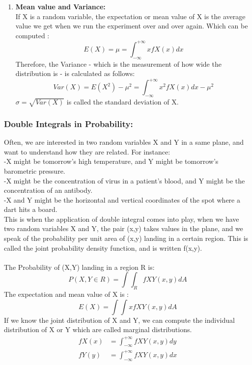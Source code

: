 \documentclass[a4paper]{article}
\begin{document}
\begin{enumerate}
\begin{itemize}
	      \end{itemize}
	\item \textbf{Mean value and Variance:} \\
	      If X is a random variable, the expectation or mean value of X is the average value we get when we run the experiment over and over again. Which can be computed : 
	      \begin{equation*}
		      E(X) = \mu =  \int_{-\infty}^{+\infty} xfX(x)dx
	      \end{equation*}
	      Therefore, the Variance - which is the measurement of how wide the distribution is - is calculated as follows:
	      \begin{equation*}
		      Var(X) = E(X^{2}) - \mu ^{2} = \int_{-\infty}^{+\infty} x^{2}fX(x)dx - \mu ^{2}
	      \end{equation*}
	      $\sigma = \sqrt{Var(X)}$ is called the standard deviation of X.
	      
\end{enumerate}
\subsubsection*{Double Integrals in Probability:}
Often, we are interested in two random variables X and Y in a same plane, and want to understand how they are related. For instance: \\
-X might be tomorrow's high temperature, and Y might be tomorrow's barometric pressure. \\
-X might be the concentration of virus in a patient's blood, and Y might be the concentration of an antibody. \\
-X and Y might be the horizontal and vertical coordinates of the spot where a dart hits a board. \\
This is when the application of double integral comes into play, when we have two random variables X and Y, the pair (x,y) takes values in the plane, and we speak of the probability per unit area of (x,y) landing in a certain region. This is called the joint probability density function, and is written f(x,y). \\ \\
The Probability of (X,Y) landing in a region R is:
\begin{equation*}
	P(X,Y \in R ) = \int \int_{R} f X Y(x,y) dA
\end{equation*}
The expectation and mean value of X is :
\begin{equation*}
	E(X) = \int \int xf X Y(x,y) dA
\end{equation*}
If we know the joint distribution of X and Y, we can compute the individual distribution of  X or Y which are called marginal distributions.
\begin{align*}
	fX(x) & =  \int_{-\infty}^{+ \infty} fXY(x,y) dy \\
	fY(y) & =  \int_{-\infty}^{+ \infty} fXY(x,y) dx \\
\end{align*}
\end{document}
